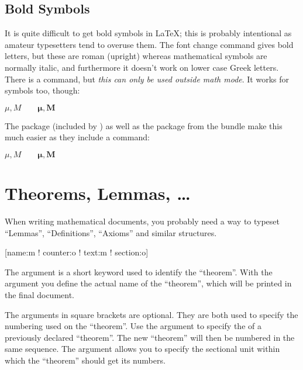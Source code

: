 

\subsection{Bold Symbols}

It is quite difficult to get bold symbols in \LaTeX{}; this is
probably intentional as amateur typesetters tend to overuse them.  The
font change command  gives bold letters, but these are
roman (upright) whereas mathematical symbols are normally italic, and
furthermore it doesn't work on lower case Greek letters.
There is a  command, but \emph{this can only be used
outside math mode}. It works for symbols too, though:
\begin{example}
$\mu, M \qquad 
\mathbf{\mu}, \mathbf{M}$
\qquad {}
\end{example}

The package  (included by ) as well as the
package  from the  bundle make this much easier as they include
a  command:

\begin{example}
$\mu, M \qquad
\boldsymbol{\mu}, \boldsymbol{M}$
\end{example}


\section{Theorems, Lemmas, \ldots}

When writing mathematical documents, you probably need a way to
typeset ``Lemmas'', ``Definitions'', ``Axioms'' and similar
structures.
\begin{lscommand}
[name:m ! counter:o ! text:m ! section:o]
\end{lscommand}
The  argument is a short keyword used to identify the
``theorem''. With the  argument you define the actual name
of the ``theorem'', which will be printed in the final document.

The arguments in square brackets are optional. They are both used to
specify the numbering used on the ``theorem''. Use  the 
argument to specify the  of a previously declared
``theorem''. The new ``theorem'' will then be numbered in the same
sequence.  The  argument allows you to specify the
sectional unit within which the ``theorem'' should get its numbers.

